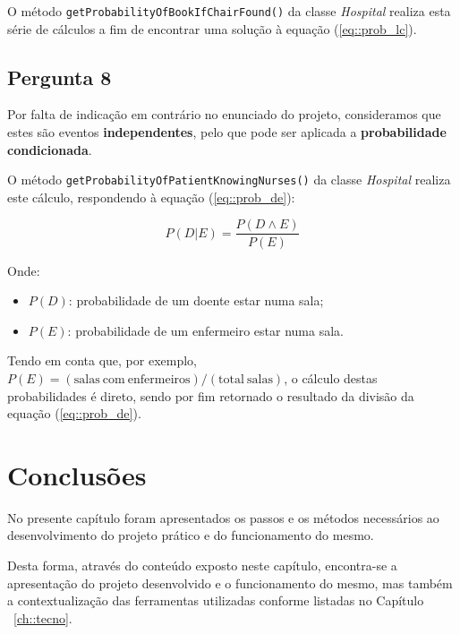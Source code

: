 O método \texttt{getProbabilityOfBookIfChairFound()} da classe \textit{Hospital} realiza esta série de cálculos a fim de encontrar uma solução à equação (\ref{eq::prob_lc}).


\subsection{Pergunta 8}
\label{ssec::implement:details:perg8}


Por falta de indicação em contrário no enunciado do projeto, consideramos que estes são eventos \textbf{independentes}, pelo que pode ser aplicada a \textbf{probabilidade condicionada}.

O método \texttt{getProbabilityOfPatientKnowingNurses()} da classe \textit{Hospital} realiza este cálculo, respondendo à equação (\ref{eq::prob_de}):

\begin{equation}
    P(D|E) = \frac{P(D \wedge E)}{P(E)}
    \label{eq::prob_de}
\end{equation}

Onde:
\begin{itemize}
    \item $P(D)$: probabilidade de um doente estar numa sala;
    \item $P(E)$: probabilidade de um enfermeiro estar numa sala.
\end{itemize}

Tendo em conta que, por exemplo, $P(E) = (\mathrm{salas~com~enfermeiros}) / (\mathrm{total~salas})$, o cálculo destas probabilidades é direto, sendo por fim retornado o resultado da divisão da equação (\ref{eq::prob_de}).



\section{Conclusões}
\label{sec::implement:conc}

No presente capítulo foram apresentados os passos e os métodos necessários ao desenvolvimento do projeto prático e do funcionamento do mesmo. 

Desta forma, através do conteúdo exposto neste capítulo, encontra-se a apresentação do projeto desenvolvido e o funcionamento do mesmo, mas também a contextualização das ferramentas utilizadas conforme listadas no Capítulo ~\ref{ch::tecno}.
